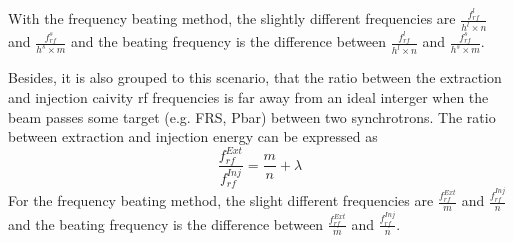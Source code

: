 With the frequency beating method, the slightly different frequencies are $\frac{f_{rf}^{l}}{h^l\times n}$ and $\frac{f_{rf}^{s}}{h^s\times m}$ and the beating frequency is the difference between $\frac{f_{rf}^{l}}{h^l\times n}$ and $\frac{f_{rf}^{s}}{h^s\times m}$.

Besides, it is also grouped to this scenario, that the ratio between the extraction and injection caivity rf frequencies is far away from an ideal interger when the beam passes some target (e.g. FRS, Pbar) between two synchrotrons. The ratio between extraction and injection energy can be expressed as
\begin{equation} 
\frac{f_{rf}^{Ext}}{f_{rf}^{Inj}}=\frac{m}{n}+ \lambda\label{close_to_interger11}
\end{equation}
For the frequency beating method, the slight different frequencies are $\frac{f_{rf}^{Ext}}{m}$ and $\frac{f_{rf}^{Inj}}{n}$ and the beating frequency is the difference between $\frac{f_{rf}^{Ext}}{m}$ and $\frac{f_{rf}^{Inj}}{n}$. 


%
%

